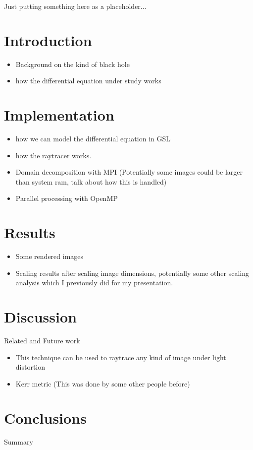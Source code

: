 Just putting something here as a placeholder...



\section{Introduction}
\begin{itemize}
	\item Background on the kind of black hole
	\item how the differential equation under study works
\end{itemize}



\section{Implementation}
\begin{itemize}
	\item how we can model the differential equation in GSL
    	\item how the raytracer works.
    	\item Domain decomposition with MPI (Potentially some images could be larger than system ram, talk about how this is handled)
    	\item Parallel processing with OpenMP
\end{itemize}


\section{Results}
\begin{itemize}
	\item Some rendered images
    	\item Scaling results after scaling image dimensions, potentially some other scaling analysis 
      which I previously did for my presentation.
\end{itemize}



\section{Discussion}
Related and Future work
\begin{itemize}
	\item This technique can be used to raytrace any kind of image under light distortion
    	\item Kerr metric (This was done by some other people before)
\end{itemize}


\section{Conclusions}
Summary

